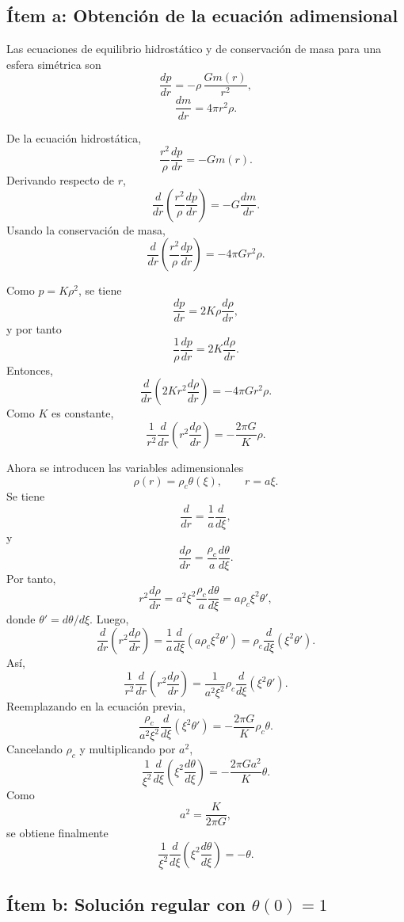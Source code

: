 \documentclass[12pt]{article}
\begin{document}
\subsection{Ítem a: Obtención de la ecuación adimensional}

Las ecuaciones de equilibrio hidrostático y de conservación de masa para una esfera simétrica son
$$
\frac{dp}{dr}=-\rho\,\frac{Gm(r)}{r^{2}},
$$
$$
\frac{dm}{dr}=4\pi r^{2}\rho .
$$

De la ecuación hidrostática,
$$
\frac{r^{2}}{\rho}\frac{dp}{dr}=-Gm(r).
$$
Derivando respecto de $r$,
$$
\frac{d}{dr}\left(\frac{r^{2}}{\rho}\frac{dp}{dr}\right)
=-G\frac{dm}{dr}.
$$
Usando la conservación de masa,
$$
\frac{d}{dr}\left(\frac{r^{2}}{\rho}\frac{dp}{dr}\right)
=-4\pi G r^{2}\rho .
$$

Como $p=K\rho^{2}$, se tiene
$$
\frac{dp}{dr}=2K\rho\frac{d\rho}{dr},
$$
y por tanto
$$
\frac{1}{\rho}\frac{dp}{dr}=2K\frac{d\rho}{dr}.
$$
Entonces,
$$
\frac{d}{dr}\left(2K r^{2}\frac{d\rho}{dr}\right)
=-4\pi G r^{2}\rho .
$$
Como $K$ es constante,
$$
\frac{1}{r^{2}}\frac{d}{dr}\left(r^{2}\frac{d\rho}{dr}\right)
=-\frac{2\pi G}{K}\rho .
$$

Ahora se introducen las variables adimensionales
$$
\rho(r)=\rho_c\theta(\xi), \qquad r=a\xi .
$$
Se tiene
$$
\frac{d}{dr}=\frac{1}{a}\frac{d}{d\xi},
$$
y
$$
\frac{d\rho}{dr}=\frac{\rho_c}{a}\frac{d\theta}{d\xi}.
$$
Por tanto,
$$
r^{2}\frac{d\rho}{dr}
=a^{2}\xi^{2}\frac{\rho_c}{a}\frac{d\theta}{d\xi}
=a\rho_c\xi^{2}\theta',
$$
donde $\theta'=d\theta/d\xi$. Luego,
$$
\frac{d}{dr}\left(r^{2}\frac{d\rho}{dr}\right)
=\frac{1}{a}\frac{d}{d\xi}
\left(a\rho_c\xi^{2}\theta'\right)
=\rho_c\frac{d}{d\xi}\left(\xi^{2}\theta'\right).
$$
Así,
$$
\frac{1}{r^{2}}\frac{d}{dr}\left(r^{2}\frac{d\rho}{dr}\right)
=\frac{1}{a^{2}\xi^{2}}\rho_c
\frac{d}{d\xi}\left(\xi^{2}\theta'\right).
$$
Reemplazando en la ecuación previa,
$$
\frac{\rho_c}{a^{2}\xi^{2}}
\frac{d}{d\xi}\left(\xi^{2}\theta'\right)
=-\frac{2\pi G}{K}\rho_c\theta .
$$
Cancelando $\rho_c$ y multiplicando por $a^{2}$,
$$
\frac{1}{\xi^{2}}
\frac{d}{d\xi}\left(\xi^{2}\frac{d\theta}{d\xi}\right)
=-\frac{2\pi G a^{2}}{K}\theta .
$$
Como
$$
a^{2}=\frac{K}{2\pi G},
$$
se obtiene finalmente
$$
\boxed{
\frac{1}{\xi^{2}}
\frac{d}{d\xi}\left(\xi^{2}\frac{d\theta}{d\xi}\right)
=-\theta
}.
$$

\subsection{Ítem b: Solución regular con $\theta(0)=1$}
\end{document}
